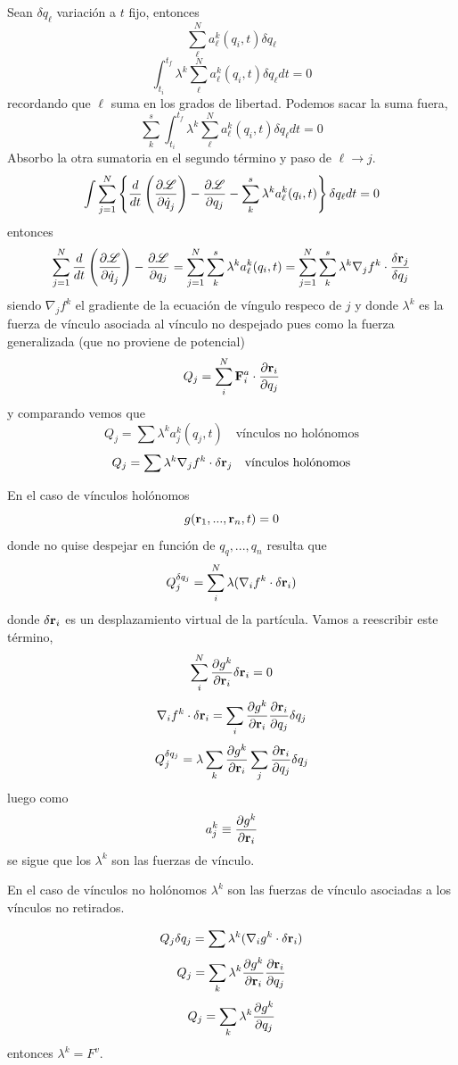 \documentclass[10pt,oneside]{CBFT_book}
\begin{document}
Sean $\delta q_\ell$ variación a $t$ fijo, entonces 
\[
	\sum_{\ell}^N a_\ell^k(q_i,t) \delta {q}_\ell
\]
\[
	\int_{t_i}^{t_f} \lambda^k \sum_{\ell}^N a_\ell^k(q_i,t) \delta {q}_\ell dt = 0
\]
recordando que $\ell$ suma en los grados de libertad. Podemos sacar la suma fuera,
\[
	\sum_{k}^s \int_{t_i}^{t_f} \lambda^k \sum_{\ell}^N a_\ell^k(q_i,t) \delta {q}_\ell dt = 0
\]
Absorbo la otra sumatoria en el segundo término y paso de $\ell \to j$.
\[
	\int  \sum_{j=1}^N \left\{ \frac{d}{dt}\left( \frac{\partial^{\hspace{-0.05em}} {\mathscr{L}}}{\partial {\dot{q}_j}^{\hspace{-0.05em}}} \right) -\frac{\partial^{\hspace{-0.05em}} {\mathscr{L}}}{\partial {q_j}^{\hspace{-0.05em}}}
	- \sum_{k}^s \lambda^k a_\ell^k(q_i,t) \right\} \delta {q}_\ell dt = 0
\]
entonces 
\[
	\sum_{j=1}^N \frac{d}{dt}\left( \dpar{\Lag}{\dot{q}_j} \right) -\dpar{\Lag}{q_j} =
	\sum_{j=1}^N \sum_{k}^s \lambda^k a_\ell^k(q_i,t) =  
	\sum_{j=1}^N \sum_{k}^s \lambda^k \nabla_j f^k \cdot \frac{\delta \vb{r}_j}{\delta q_j} 
\]
siendo $\nabla_j f^k $ el gradiente de la ecuación de víngulo respeco de $j$ y donde $\lambda^k$
es la fuerza de vínculo asociada al vínculo no despejado pues como la fuerza generalizada
(que no proviene de potencial)
\[
	Q_j = \sum_i^N \vb{F}_i^a \cdot \dpar{\vb{r}_i}{q_j}
\]
y comparando vemos que 
\[
	Q_j = \sum \lambda^k a^k_j(q_j,t) \quad \textrm{vínculos no holónomos}
\]
\[
	Q_j=  \sum \lambda^k \nabla_j f^k \cdot \delta \vb{r}_j  \quad \textrm{vínculos holónomos}
\]

En el caso de vínculos holónomos 
\[
	g(\vb{r}_1,...,\vb{r}_n,t) = 0 
\]
donde no quise despejar en función de $q_q,...,q_n$ resulta que 
\[
	Q_j^{\delta q_j} =  \sum_i^N \lambda (\nabla_i f^k\cdot\delta\vb{r}_i)
\]
donde $\delta\vb{r}_i$ es un desplazamiento virtual de la partícula.
Vamos a reescribir este término,
\[
	\sum_i^N \dpar{g^k}{\vb{r}_i} \delta \vb{r}_i = 0
\]
\[
	\nabla_i f^k\cdot\delta\vb{r}_i = \sum_i \dpar{g^k}{\vb{r}_i} \dpar{\vb{r}_i}{q_j} \delta q_j
\]
\[
	Q_j^{\delta q_j} =  \lambda \sum_k \dpar{g^k}{\vb{r}_i} \sum_j \dpar{\vb{r}_i}{q_j} \delta q_j
\]
luego como 
\[
	a^k_j \equiv \dpar{g^k}{\vb{r}_i}
\]
se sigue que los $\lambda^k$ son las fuerzas de vínculo.

En el caso de vínculos no holónomos $\lambda^k$ son las fuerzas de vínculo asociadas a los 
vínculos no retirados.

\[
	Q_j {\delta q_j} =  \sum \lambda^k (\nabla_i g^k\cdot\delta\vb{r}_i)
\]
\[
	Q_j =  \sum_k \lambda^k \dpar{g^k}{\vb{r}_i} \dpar{\vb{r}_i}{q_j}
\]
\[
	Q_j =  \sum_k \lambda^k \frac{\partial^{\hspace{-0.05em}} {g^k}}{\partial {q_j}^{\hspace{-0.05em}}}
\]
entonces $\lambda^k=F^v$.
\end{document}

